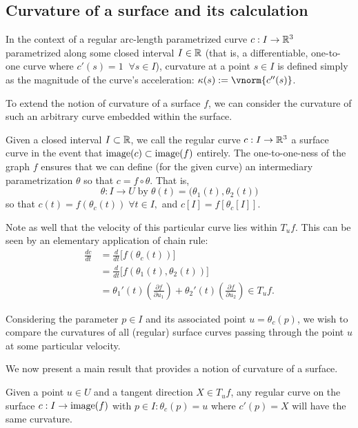 

\subsection{Curvature of a surface and its calculation}
In the context of a regular arc-length parametrized curve $c: I \to \mathbb{R}^3$ parametrized along some closed interval $I\in \mathbb{R}$
 (that is, a differentiable, one-to-one curve where $c'(s) = 1 \;\; \forall s \in I$), curvature at a point $s \in I$ is defined simply as the magnitude of the curve's acceleration: $\kappa(s) := \vnorm{c''(s)}$.
 
 To extend the notion of curvature of a surface $f$, we can consider the curvature of such an arbitrary curve embedded within the surface.
 
 \begin{defn} \label{def:curve-on-a-surface}
 	Given a closed interval $I \subset \mathbb{R}$, we call the regular curve
 	$c: I \to \mathbb{R}^3$ a surface curve in the event that $\mathrm{image}(c) \subset \mathrm{image}(f)$ entirely. The one-to-one-ness of the graph $f$ ensures that we can define (for the given curve) an intermediary parametrization $\theta$  so that
 	$ c = f \circ \theta $. That is,
 	\[
 	\theta : I \to U \; \textrm{by} \; \theta(t) = \big(\theta_1(t), \theta_2(t)\big)
 	\]
 	so that $c(t) = f(\theta_c(t)) \;\forall t\in I,$
 	and $c[I] = f\left[\theta_c[I]\right]$.
 \end{defn}
 Note as well that the velocity of this particular curve lies within $T_u f$. This
 can be seen by an elementary application of chain rule:
 \begin{align}
 \frac{d c}{dt} &= \frac{d}{dt}\big[ f(\theta_c(t))\big] \nonumber \\
 &= \frac{d}{dt}\big[f(\theta_1(t), \theta_2(t))\big] \nonumber \\
 &= \theta_1'(t)\left( \frac{\partial f}{\partial u_1} \right) + 
 \theta_2'(t)\left( \frac{\partial f}{\partial u_2} \right) \in T_uf.
 \end{align}
 
 Considering the parameter $p \in I$ and its associated point $u = \theta_c(p)$, we wish to compare the curvatures of all (regular) surface curves passing through the point $u$ at some particular velocity.
 
 We now present a main result that provides a notion of curvature of a surface.

	\begin{theorem} \label{thm:meusnier}
		Given a point $u \in U $ and a tangent direction $X \in T_u f$,
  any regular curve on the surface $c: I \to \mathrm{image}(f)$ with $p\in I : \theta_c(p) = u$
  where $c'(p) = X$ will have the same curvature.
	\end{theorem}
	
